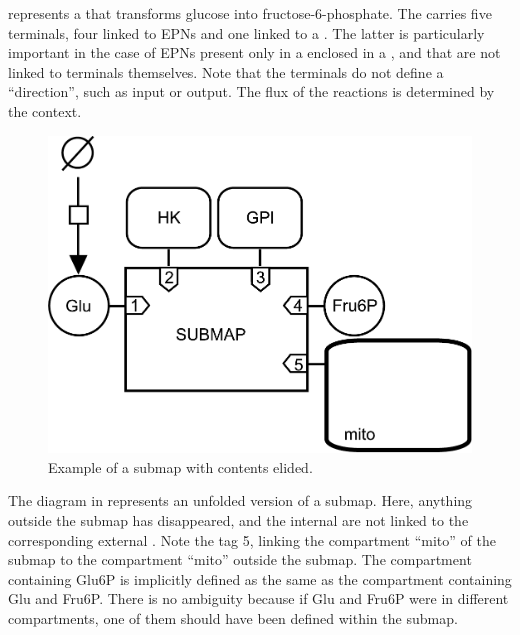  represents a  that transforms glucose into fructose-6-phosphate. The  carries five terminals, four linked to EPNs and one linked to a .  The latter is particularly important in the case of EPNs present only in a  enclosed in a , and that are not linked to terminals themselves.  Note that the terminals do not define a ``direction'', such as input or output.  The flux of the reactions is determined by the context.

\begin{figure}[H]
  \centering
  \includegraphics[scale = 0.4]{examples/submap-folded}
  \caption{Example of a submap with contents elided.}
  \label{fig:submap-folded}
\end{figure}

The diagram in  represents an unfolded version of a submap.  Here, anything outside the submap has disappeared, and the internal  are not linked to the corresponding external .  Note the tag 5, linking the compartment ``mito'' of the submap to the compartment ``mito'' outside the submap.  The compartment containing Glu6P is implicitly defined as the same as the compartment containing Glu and Fru6P.  There is no ambiguity because if Glu and Fru6P were in different compartments, one of them should have been defined within the submap.

